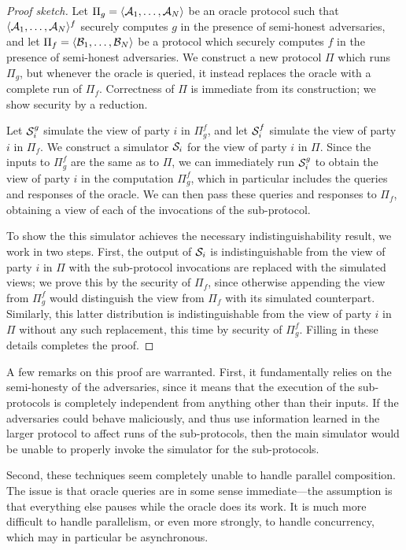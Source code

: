 \begin{proof}[Proof sketch]
  Let $\Pi_g = \langle\mathcal{A}_1,\dots,\mathcal{A}_N\rangle$ be an oracle protocol such that
  $\langle\mathcal{A}_1,\dots,\mathcal{A}_N\rangle^f$ securely computes $g$ in the presence of semi-honest
  adversaries, and let $\Pi_f = \langle\mathcal{B}_1,\dots,\mathcal{B}_N\rangle$ be a protocol which securely
  computes $f$ in the presence of semi-honest adversaries. We construct a new
  protocol $\Pi$ which runs $\Pi_g$, but whenever the oracle is queried, it
  instead replaces the oracle with a complete run of $\Pi_f$. Correctness of
  $\Pi$ is immediate from its construction; we show security by a reduction.

  Let $\mathcal{S}^g_i$ simulate the view of party $i$ in $\Pi_g^f$, and let $\mathcal{S}^f_i$
  simulate the view of party $i$ in $\Pi_f$. We construct a simulator $\mathcal{S}_i$
  for the view of party $i$ in $\Pi$. Since the inputs to $\Pi_g^f$ are the same
  as to $\Pi$, we can immediately run $\mathcal{S}^g_i$ to obtain the view of party $i$
  in the computation $\Pi_g^f$, which in particular includes the queries and
  responses of the oracle. We can then pass these queries and responses to
  $\Pi_f$, obtaining a view of each of the invocations of the sub-protocol.

  To show the this simulator achieves the necessary indistinguishability result,
  we work in two steps. First, the output of $\mathcal{S}_i$ is indistinguishable from
  the view of party $i$ in $\Pi$ with the sub-protocol invocations are
  replaced with the simulated views; we prove this by the security of $\Pi_f$,
  since otherwise appending the view from $\Pi_g^f$ would distinguish the view
  from $\Pi_f$ with its simulated counterpart. Similarly, this latter distribution
  is indistinguishable from the view of party $i$ in $\Pi$ without any such
  replacement, this time by security of $\Pi_g^f$. Filling in these details
  completes the proof.
\end{proof}

A few remarks on this proof are warranted. First, it fundamentally relies on the
semi-honesty of the adversaries, since it means that the execution of the
sub-protocols is completely independent from anything other than their inputs.
If the adversaries could behave maliciously, and thus use information learned in
the larger protocol to affect runs of the sub-protocols, then the main simulator
would be unable to properly invoke the simulator for the sub-protocols.

Second, these techniques seem completely unable to handle parallel composition.
The issue is that oracle queries are in some sense immediate---the assumption is
that everything else pauses while the oracle does its work. It is much more
difficult to handle parallelism, or even more strongly, to handle concurrency,
which may in particular be asynchronous.

